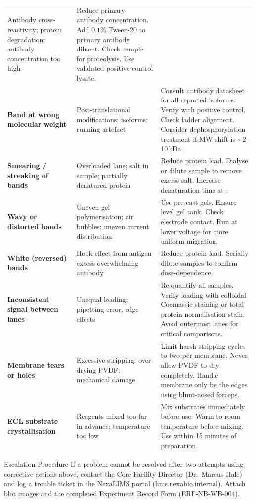 {\begin{longtable}{@{}P{3.6cm}P{4.2cm}P{5.4cm}@{}}
  Antibody cross-reactivity; protein degradation; antibody concentration too high &
  Reduce primary antibody concentration. Add $0.1\%$ Tween-20 to primary
  antibody diluent. Check sample for proteolysis. Use validated positive control
  lysate. \\[3pt]
  \textbf{Band at wrong molecular weight} &
  Post-translational modifications; isoforms; running artefact &
  Consult antibody datasheet for all reported isoforms. Verify with positive
  control. Check ladder alignment. Consider dephosphorylation treatment if
  MW shift is \textasciitilde\,2--10\,kDa. \\[3pt]
  \textbf{Smearing / streaking of bands} &
  Overloaded lane; salt in sample; partially denatured protein &
  Reduce protein load. Dialyse or dilute sample to remove excess salt. Increase
  denaturation time at . \\[3pt]
  \textbf{Wavy or distorted bands} &
  Uneven gel polymerisation; air bubbles; uneven current distribution &
  Use pre-cast gels. Ensure level gel tank. Check electrode contact. Run at
  lower voltage for more uniform migration. \\[3pt]
  \textbf{White (reversed) bands} &
  Hook effect from antigen excess overwhelming antibody &
  Reduce protein load. Serially dilute samples to confirm dose-dependence. \\[3pt]
  \textbf{Inconsistent signal between lanes} &
  Unequal loading; pipetting error; edge effects &
  Re-quantify all samples. Verify loading with colloidal Coomassie staining
  or total protein normalisation stain. Avoid outermost lanes for critical
  comparisons. \\[3pt]
  \textbf{Membrane tears or holes} &
  Excessive stripping; over-drying PVDF; mechanical damage &
  Limit harsh stripping cycles to two per membrane. Never allow PVDF to dry
  completely. Handle membrane only by the edges using blunt-nosed forceps. \\[3pt]
  \textbf{ECL substrate crystallisation} &
  Reagents mixed too far in advance; temperature too low &
  Mix substrates immediately before use. Warm to room temperature before mixing.
  Use within 15 minutes of preparation. \\
\end{longtable}
}

\par\vspace{4pt}
\begin{notebox}{Escalation Procedure}
If a problem cannot be resolved after two attempts using corrective actions above,
contact the Core Facility Director (Dr.~Marcus Hale) and log a trouble ticket in
the NexaLIMS portal (lims.nexabio.internal). Attach blot images and the completed
Experiment Record Form (ERF-NB-WB-004).
\end{notebox}

